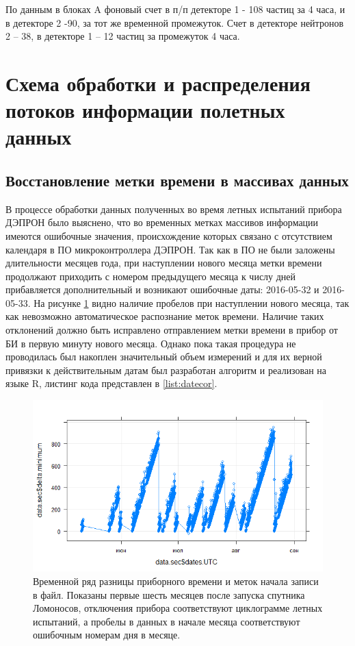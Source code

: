По данным в блоках A фоновый счет в п/п детекторе 1 - 108 частиц за 4 часа, и в детекторе 2 -90, за тот же временной промежуток. Счет в детекторе нейтронов 2 – 38, в детекторе 1 – 12 частиц за промежуток 4  часа.


\section{Схема обработки и распределения потоков информации полетных данных}\label{sec3.2}
\subsection{Восстановление метки времени в массивах данных}
В процессе обработки данных полученных во время летных испытаний прибора ДЭПРОН было выяснено, что во временных метках массивов информации имеются ошибочные значения, происхождение которых связано с отсутствием календаря в ПО микроконтроллера ДЭПРОН. Так как в ПО не были заложены длительности месяцев года, при наступлении нового месяца метки времени продолжают приходить с номером предыдущего месяца к числу дней прибавляется дополнительный и возникают ошибочные даты: 2016-05-32 и 2016-05-33. На рисунке \ref{fig:deprontimedifference} видно наличие пробелов при наступлении нового месяца, так как невозможно автоматическое распознание меток времени. Наличие таких отклонений должно быть исправлено отправлением метки времени в прибор от БИ в первую минуту нового месяца. Однако пока такая процедура не проводилась был накоплен значительный объем измерений и для их верной привязки к действительным датам был разработан алгоритм и реализован на языке R, листинг кода представлен в \ref{list:datecor}.

\begin{figure}
	\centering
	\includegraphics[width=0.9\linewidth]{images/deprontimedifference}
	\caption[Временной ряд разницы приборного времени и меток начала записи в  файл.]{Временной ряд разницы приборного времени и меток начала записи в файл. Показаны первые шесть месяцев после запуска спутника Ломоносов, отключения прибора соответствуют циклограмме летных испытаний, а пробелы в данных в начале месяца соответствуют ошибочным номерам дня в месяце.}
	\label{fig:deprontimedifference}
\end{figure}

